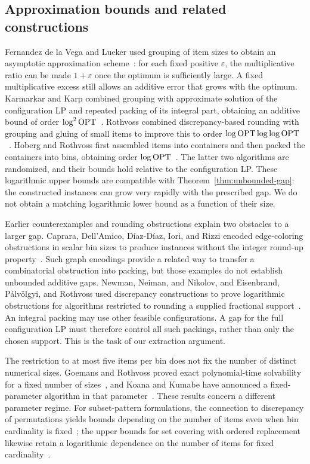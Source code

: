\subsection{Approximation bounds and related constructions}

Fernandez de la Vega and Lueker used grouping of item sizes to obtain
an asymptotic approximation scheme~\cite{FernandezDeLaVegaLueker1981}:
for each fixed positive
$\varepsilon$, the multiplicative ratio can be made $1+\varepsilon$
once the optimum is sufficiently large. A fixed multiplicative excess
still allows an additive error that grows with the optimum.
Karmarkar and Karp combined grouping with approximate solution of
the configuration LP and repeated packing of its integral part,
obtaining an additive bound of order
$\log^2\operatorname{OPT}$~\cite{KarmarkarKarp1982}.
Rothvoss combined discrepancy-based rounding with grouping and gluing
of small items to improve this to order
$\log\operatorname{OPT}\log\log\operatorname{OPT}$~\cite{Rothvoss2013}.
Hoberg and Rothvoss first assembled items into containers and then
packed the containers into bins, obtaining order
$\log\operatorname{OPT}$~\cite{HobergRothvoss2017}.
The latter two algorithms are randomized, and their bounds hold relative
to the configuration LP.
These logarithmic upper bounds are compatible with
Theorem~\ref{thm:unbounded-gap}: the constructed instances can grow very
rapidly with the prescribed gap. We do not obtain a matching logarithmic
lower bound as a function of their size.

Earlier counterexamples and rounding obstructions explain two obstacles
to a larger gap. Caprara, Dell'Amico, D\'iaz-D\'iaz, Iori, and Rizzi
encoded edge-coloring obstructions in scalar bin sizes to produce
instances without the integer round-up
property~\cite{CapraraDellAmicoDiazDiazIoriRizzi2015}.
Such graph encodings provide a related way to transfer a combinatorial
obstruction into packing, but those examples do not establish unbounded
additive gaps. Newman, Neiman, and Nikolov, and Eisenbrand,
P\'alv\"olgyi, and Rothvoss used discrepancy constructions to prove
logarithmic obstructions for algorithms restricted to rounding a supplied
fractional support~\cite{NewmanNeimanNikolov2012,EisenbrandPalvolgyiRothvoss2013}.
An integral packing may use
other feasible configurations. A gap for the full configuration LP must
therefore control all such packings, rather than only the chosen support.
This is the task of our extraction argument.

The restriction to at most five items per bin does not fix the number of
distinct numerical sizes. Goemans and Rothvoss proved exact polynomial-time
solvability for a fixed number of sizes~\cite{GoemansRothvoss2014}, and
Koana and Kumabe have announced a fixed-parameter algorithm in that
parameter~\cite{KoanaKumabe2026}. These results concern a different
parameter regime. For subset-pattern formulations, the connection to
discrepancy of permutations yields bounds depending on the number of items
even when bin cardinality is fixed~\cite{EisenbrandPalvolgyiRothvoss2013};
the upper bounds for set covering with ordered replacement likewise
retain a logarithmic dependence on the number of items for fixed
cardinality~\cite{EisenbrandEtAl2011}.

